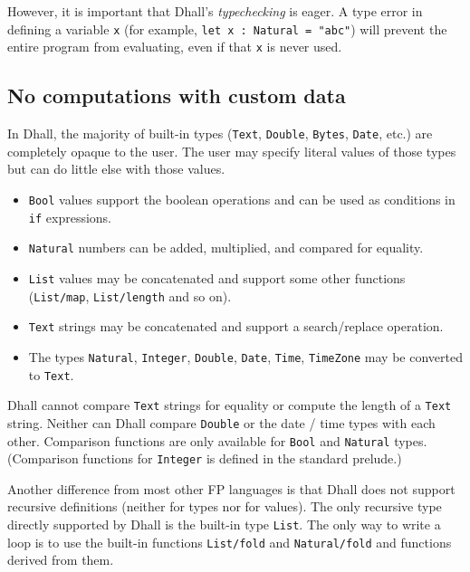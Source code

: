 However, it is important that Dhall's \emph{typechecking} is eager.
A type error in defining a variable \lstinline!x! (for example, \lstinline!let x : Natural = "abc"!) will prevent the entire program from evaluating, even if that \lstinline!x! is never used.


\subsection{No computations with custom data}


In Dhall, the majority of built-in types (\lstinline!Text!, \lstinline!Double!, \lstinline!Bytes!, \lstinline!Date!, etc.) are completely opaque to the user.
The user may specify literal values of those types but can do little else with those values.


\begin{itemize}
\item{\lstinline!Bool! values support the boolean operations and can be used as conditions in \lstinline!if! expressions.}
\item{\lstinline!Natural! numbers can be added, multiplied, and compared for equality.}
\item{\lstinline!List! values may be concatenated and support some other functions (\lstinline!List/map!, \lstinline!List/length! and so on).}
\item{\lstinline!Text! strings may be concatenated and support a search/replace operation.}
\item{The types \lstinline!Natural!, \lstinline!Integer!, \lstinline!Double!, \lstinline!Date!, \lstinline!Time!, \lstinline!TimeZone! may be converted to \lstinline!Text!.}
\end{itemize}
Dhall cannot compare \lstinline!Text! strings for equality or compute the length of a \lstinline!Text! string.
Neither can Dhall compare \lstinline!Double! or the date / time types with each other.
Comparison functions are only available for \lstinline!Bool! and \lstinline!Natural! types.
(Comparison functions for \lstinline!Integer! is defined in the standard prelude.)


Another difference from most other FP languages is that Dhall does not support recursive definitions (neither for types nor for values).
The only recursive type directly supported by Dhall is the built-in type \lstinline!List!.
The only way to write a loop is to use the built-in functions \lstinline!List/fold! and \lstinline!Natural/fold! and functions derived from them.


